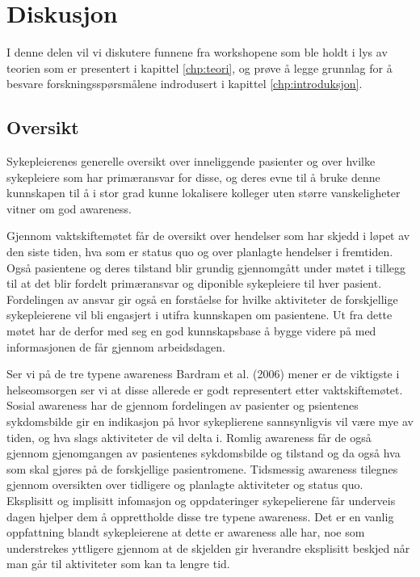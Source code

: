 \chapter{Diskusjon}
\label{chp:diskusjon}
I denne delen vil vi diskutere funnene fra workshopene som ble holdt i lys av teorien som er presentert i kapittel \ref{chp:teori}, og prøve å legge grunnlag for å besvare forskningsspørsmålene indrodusert i kapittel \ref{chp:introduksjon}.

\noindent
\section{Oversikt}
Sykepleierenes generelle oversikt over inneliggende pasienter og over hvilke sykepleiere som har primæransvar for disse, og deres evne til å bruke denne kunnskapen til å i stor grad kunne lokalisere kolleger uten større vanskeligheter vitner om god awareness. 

\noindent
Gjennom vaktskiftemøtet får de oversikt over hendelser som har skjedd i løpet av den siste tiden, hva som er status quo og over planlagte hendelser i fremtiden. Også pasientene og deres tilstand blir grundig gjennomgått under møtet i tillegg til at det blir fordelt primæransvar og diponible sykepleiere til hver pasient. Fordelingen av ansvar gir også en forståelse for hvilke aktiviteter de forskjellige sykepleierene vil bli engasjert i utifra kunnskapen om pasientene. Ut fra dette møtet har de derfor med seg en god kunnskapsbase å bygge videre på med informasjonen de får gjennom arbeidsdagen. 

\noindent
Ser vi på de tre typene awareness Bardram et al. (2006) mener er de viktigste i helseomsorgen ser vi at disse allerede er godt representert etter vaktskiftemøtet. Sosial awareness har de gjennom fordelingen av pasienter og psientenes sykdomsbilde gir en indikasjon på hvor sykeplierene sannsynligvis vil være mye av tiden, og hva slags aktiviteter de vil delta i. Romlig awareness får de også gjennom gjenomgangen av pasientenes sykdomsbilde og tilstand og da også hva som skal gjøres på de forskjellige pasientromene. Tidsmessig awareness tilegnes gjennom oversikten over tidligere og planlagte aktiviteter og status quo. Eksplisitt og implisitt infomasjon og oppdateringer sykepelierene får underveis dagen hjelper dem å opprettholde disse tre typene awareness. Det er en vanlig oppfattning blandt sykepleierene at dette er awareness alle har, noe som understrekes yttligere gjennom at de skjelden gir hverandre eksplisitt beskjed når man går til aktiviteter som kan ta lengre tid. 

